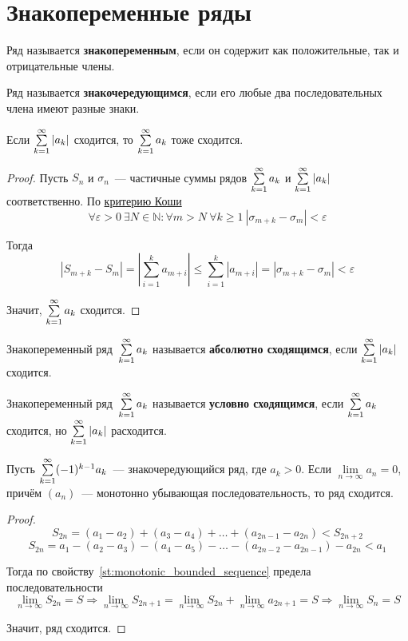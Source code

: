 \section{Знакопеременные ряды}
 Ряд называется \textbf{знакопеременным}, если он содержит как положительные, так и отрицательные члены.

 Ряд называется \textbf{знакочередующимся}, если его любые два последовательных члена имеют разные знаки.

\begin{theorem}
Если $\series |a_k|$ сходится, то $\series a_k$ тоже сходится.
\end{theorem}
\begin{proof}
Пусть $S_n$ и $\sigma_n$~--- частичные суммы рядов $\series a_k$ и $\series |a_k|$ соответственно.
По \hyperref[th:Cauchy_criterion]{критерию Коши}
\begin{equation*}
\forall \varepsilon > 0 \
\exists N \in \mathbb N \colon
\forall m > N \ \forall k \geqslant 1 \
|\sigma_{m+k} - \sigma_m| < \varepsilon
\end{equation*}

Тогда
\begin{equation*}
|S_{m+k} - S_m| =
\left| \sum_{i=1}^k a_{m+i} \right| \leqslant
\sum_{i=1}^k |a_{m+i}| =
|\sigma_{m+k} - \sigma_m| < \varepsilon
\end{equation*}

Значит, $\series a_k$ сходится.
\end{proof}

Знакопеременный ряд~$\series a_k$ называется \textbf{абсолютно сходящимся}, если $\series |a_k|$ сходится.

Знакопеременный ряд~$\series a_k$ называется \textbf{условно сходящимся}, если $\series a_k$ сходится, но $\series |a_k|$ расходится.

\index{Признак!Лейбница}
\begin{theorem}
Пусть $\series (-1)^{k-1} a_k$~--- знакочередующийся ряд, где $a_k > 0$.
Если $\lim\limits_{n \to \infty} a_n = 0$, причём $(a_n)$~--- монотонно убывающая последовательность, то ряд сходится.
\end{theorem}
\begin{proof}
\begin{equation*}
S_{2n} = (a_1 - a_2) + (a_3 - a_4) + \ldots + (a_{2n-1} - a_{2n}) < S_{2n+2}
\end{equation*}
\begin{equation*}
S_{2n} = a_1 - (a_2 - a_3) - (a_4 - a_5) - \ldots - (a_{2n-2} - a_{2n-1}) - a_{2n} < a_1
\end{equation*}

Тогда по свойству~\ref{st:monotonic_bounded_sequence} предела последовательности
\begin{equation*}
\lim_{n \to \infty} S_{2n} = S \Rightarrow
\lim_{n \to \infty} S_{2n+1} =
\lim_{n \to \infty} S_{2n} + \lim_{n \to \infty} a_{2n+1} =
S \Rightarrow
\lim_{n \to \infty} S_n = S
\end{equation*}

Значит, ряд сходится.
\end{proof}

